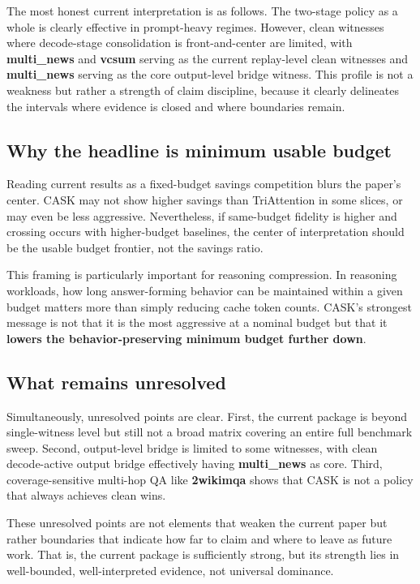 The most honest current interpretation is as follows. The two-stage policy as a whole is clearly effective in prompt-heavy regimes. However, clean witnesses where decode-stage consolidation is front-and-center are limited, with \textbf{multi\_news} and \textbf{vcsum} serving as the current replay-level clean witnesses and \textbf{multi\_news} serving as the core output-level bridge witness. This profile is not a weakness but rather a strength of claim discipline, because it clearly delineates the intervals where evidence is closed and where boundaries remain.


\subsection{Why the headline is minimum usable budget}


Reading current results as a fixed-budget savings competition blurs the paper's center. CASK may not show higher savings than TriAttention in some slices, or may even be less aggressive. Nevertheless, if same-budget fidelity is higher and crossing occurs with higher-budget baselines, the center of interpretation should be the usable budget frontier, not the savings ratio.


This framing is particularly important for reasoning compression. In reasoning workloads, how long answer-forming behavior can be maintained within a given budget matters more than simply reducing cache token counts. CASK's strongest message is not that it is the most aggressive at a nominal budget but that it \textbf{lowers the behavior-preserving minimum budget further down}.


\subsection{What remains unresolved}


Simultaneously, unresolved points are clear. First, the current package is beyond single-witness level but still not a broad matrix covering an entire full benchmark sweep. Second, output-level bridge is limited to some witnesses, with clean decode-active output bridge effectively having \textbf{multi\_news} as core. Third, coverage-sensitive multi-hop QA like \textbf{2wikimqa} shows that CASK is not a policy that always achieves clean wins.


These unresolved points are not elements that weaken the current paper but rather boundaries that indicate how far to claim and where to leave as future work. That is, the current package is sufficiently strong, but its strength lies in well-bounded, well-interpreted evidence, not universal dominance.


